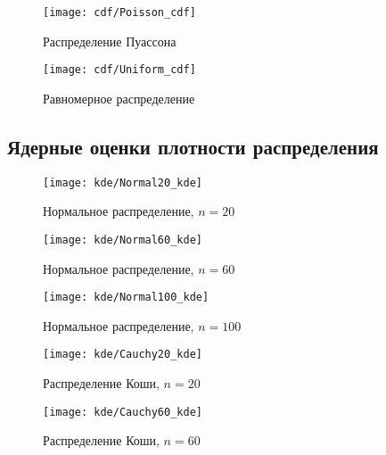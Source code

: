 \begin{figure}[H]
	\begin{center}
		\texttt{[image: cdf/Poisson\_cdf]}
		\caption{Распределение Пуассона} 
		\label{pic:pic_name} 
	\end{center}
\end{figure}

\begin{figure}[H]
	\begin{center}
		\texttt{[image: cdf/Uniform\_cdf]}
		\caption{Равномерное распределение} 
		\label{pic:pic_name} 
	\end{center}
\end{figure}


\subsection{Ядерные оценки плотности распределения}

\begin{figure}[H]
	\begin{center}
		\texttt{[image: kde/Normal20\_kde]}
		\caption{Нормальное распределение, $n=20$} 
		\label{pic:pic_name} 
	\end{center}
\end{figure}

\begin{figure}[H]
	\begin{center}
		\texttt{[image: kde/Normal60\_kde]}
		\caption{Нормальное распределение, $n=60$} 
		\label{pic:pic_name} 
	\end{center}
\end{figure}

\begin{figure}[H]
	\begin{center}
		\texttt{[image: kde/Normal100\_kde]}
		\caption{Нормальное распределение, $n=100$} 
		\label{pic:pic_name} 
	\end{center}
\end{figure}

\begin{figure}[H]
	\begin{center}
		\texttt{[image: kde/Cauchy20\_kde]}
		\caption{Распределение Коши, $n=20$} 
		\label{pic:pic_name} 
	\end{center}
\end{figure}

\begin{figure}[H]
	\begin{center}
		\texttt{[image: kde/Cauchy60\_kde]}
		\caption{Распределение Коши, $n=60$} 
		\label{pic:pic_name} 
	\end{center}
\end{figure}

